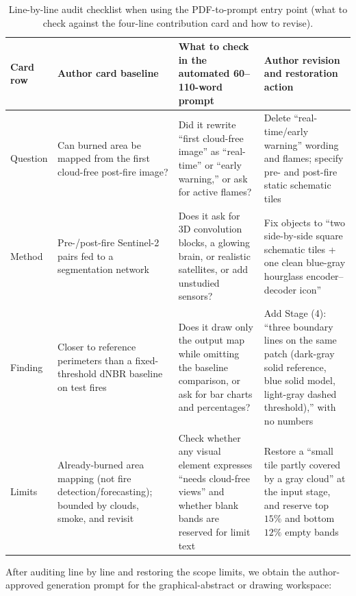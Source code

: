 \begin{table}[htbp]\centering\footnotesize
\setlength{\tabcolsep}{3pt}
\renewcommand{\arraystretch}{1.15}
\caption{Line-by-line audit checklist when using the PDF-to-prompt entry point (what to check against the four-line contribution card and how to revise).}\label{tab:ch10-03-compare}
\begin{tabularx}{\linewidth}{@{}>{\raggedright\arraybackslash}p{15mm}>{\raggedright\arraybackslash}p{31mm}YY@{}}
\toprule
\textbf{Card row} & \textbf{Author card baseline} & \textbf{What to check in the automated 60--110-word prompt} & \textbf{Author revision and restoration action} \\
\midrule
Question & Can burned area be mapped from the first cloud-free post-fire image? & Did it rewrite ``first cloud-free image'' as ``real-time'' or ``early warning,'' or ask for active flames? & Delete ``real-time/early warning'' wording and flames; specify pre- and post-fire static schematic tiles \\
Method & Pre-/post-fire Sentinel-2 pairs fed to a segmentation network & Does it ask for 3D convolution blocks, a glowing brain, or realistic satellites, or add unstudied sensors? & Fix objects to ``two side-by-side square schematic tiles + one clean blue-gray hourglass encoder--decoder icon'' \\
Finding & Closer to reference perimeters than a fixed-threshold dNBR baseline on test fires & Does it draw only the output map while omitting the baseline comparison, or ask for bar charts and percentages? & Add Stage (4): ``three boundary lines on the same patch (dark-gray solid reference, blue solid model, light-gray dashed threshold),'' with no numbers \\
Limits & Already-burned area mapping (not fire detection/forecasting); bounded by clouds, smoke, and revisit & Check whether any visual element expresses ``needs cloud-free views'' and whether blank bands are reserved for limit text & Restore a ``small tile partly covered by a gray cloud'' at the input stage, and reserve top $15\%$ and bottom $12\%$ empty bands \\
\bottomrule
\end{tabularx}
\end{table}

After auditing line by line and restoring the scope limits, we obtain the author-approved generation prompt for the graphical-abstract or drawing workspace:

